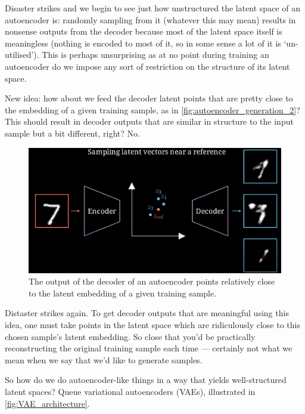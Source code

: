 \documentclass[11pt]{article}
\begin{document}
\noindent Disaster strikes and we begin to see just how unstructured the latent space of an autoencoder is: randomly sampling from it (whatever this may mean) results in nonsense outputs from the decoder because most of the latent space itself is meaningless (nothing is encoded to most of it, so in some sense a lot of it is `un-utilised'). This is perhaps unsurprising as at no point during training an autoencoder do we impose any sort of restriction on the structure of its latent space.

New idea: how about we feed the decoder latent points that are pretty close to the embedding of a given training sample, as in \autoref{fig:autoencoder_generation_2}? This should result in decoder outputs that are similar in structure to the input sample but a bit different, right? No.

\begin{figure}[ht]
    \centering
    \includegraphics[width=0.75\columnwidth]{./figures/generative_models/AE_gen_2.png}
    \caption{The output of the decoder of an autoencoder points relatively close to the latent embedding of a given training sample.}
    \label{fig:autoencoder_generation_2}
\end{figure}

\noindent Distaster strikes again. To get decoder outputs that are meaningful using this idea, one must take points in the latent space which are ridiculously close to this chosen sample's latent embedding. So close that you'd be practically reconstructing the original training sample each time — certainly not what we mean when we say that we'd like to generate samples.

So how do we do autoencoder-like things in a way that yields well-structured latent spaces? Queue variational autoencoders (VAEs), illustrated in \autoref{fig:VAE_architecture}.
\end{document}
